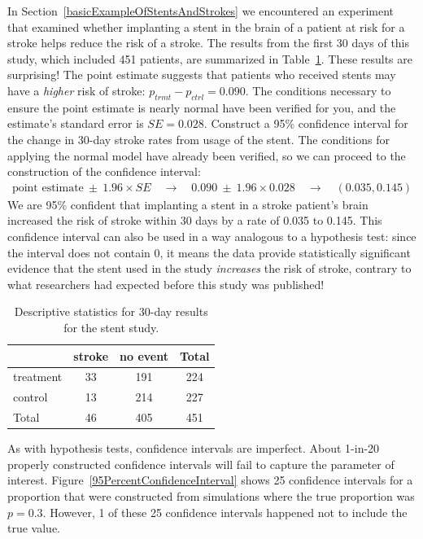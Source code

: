 \begin{example}{In Section~\ref{basicExampleOfStentsAndStrokes} we encountered an experiment that examined whether implanting a stent in the brain of a patient at risk for a stroke helps reduce the risk of a stroke. The results from the first 30 days of this study, which included 451 patients, are summarized in Table~\ref{stentStudyResultsCIsection}. These results are surprising! The point estimate suggests that patients who received stents may have a \emph{higher} risk of stroke: $p_{trmt} - p_{ctrl} = 0.090$. The conditions necessary to ensure the point estimate is nearly normal have been verified for you, and the estimate's standard error is $SE = 0.028$. Construct a 95\% confidence interval for the change in 30-day stroke rates from usage of the stent.}
\label{stentStroke95CI_CIsection}
The conditions for applying the normal model have already been verified, so we can proceed to the construction of the confidence interval:
\begin{align*}
\text{point estimate}\ \pm\ 1.96 \times SE \quad \rightarrow \quad
0.090\ \pm\ 1.96 \times 0.028 \quad \rightarrow \quad
(0.035, 0.145)
\end{align*}
We are 95\% confident that implanting a stent in a stroke patient's brain increased the risk of stroke within 30 days by a rate of 0.035 to 0.145. This confidence interval can also be used in a way analogous to a hypothesis test: since the interval does not contain 0, it means the data provide statistically significant evidence that the stent used in the study \emph{increases} the risk of stroke, contrary to what researchers had expected before this study was published!
\end{example}

\begin{table}[h]
\centering
\begin{tabular}{l cc c}
  \hline
	& 	stroke 	& no event & Total \\
  \hline
treatment 	& 33		& 191	& 224 \\
control 	& 13		& 214	& 227 \\
  \hline
Total		& 46		& 405	& 451 \\
  \hline
\end{tabular}
\caption{Descriptive statistics for 30-day results for the stent study.}
\label{stentStudyResultsCIsection}
\end{table}

As with hypothesis tests, confidence intervals are imperfect. About 1-in-20 properly constructed confidence intervals will fail to capture the parameter of interest. Figure~\ref{95PercentConfidenceInterval} shows 25 confidence intervals for a proportion that were constructed from simulations where the true proportion was $p = 0.3$. However, 1 of these 25 confidence intervals happened not to include the true value.


